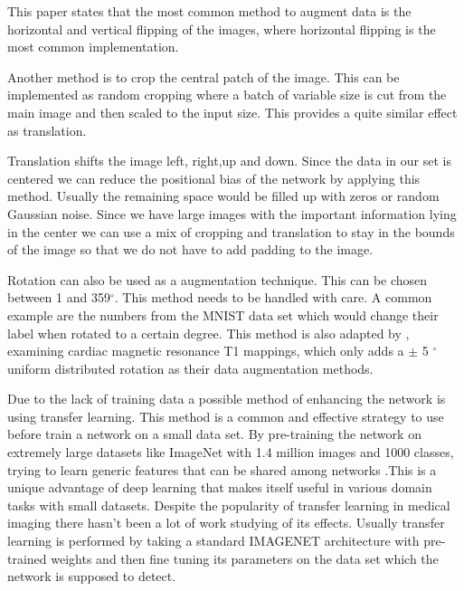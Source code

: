 \documentclass[
a4paper, 
12pt,
grayscalebody, %
abstract=on,
twoside, BCOR10mm, 12pt, DIV13,headinclude, footexclude, final, abstracton, openright
]{ibireprt}
\numberwithin{equation}{chapter}
\numberwithin{table}{chapter}
\numberwithin{figure}{chapter}
\numberwithin{algorithm}{chapter}
\numberwithin{example}{chapter}
\numberwithin{example}{chapter}
\begin{document}
This paper states that the most common method to augment data is the horizontal and vertical flipping of the images, where horizontal flipping is the most common implementation.

Another method is to crop the central patch of the image. This can be implemented as random cropping where a batch of variable size is cut from the main image and then scaled to the input size. This provides a quite similar effect as translation. 

Translation shifts the image left, right,up and  down. Since the data in our set is centered we can reduce the positional bias of the network by applying this method. Usually the remaining space would be filled up with zeros or random Gaussian noise. Since we have large images with the important information lying in the center we can use a mix of cropping and translation to stay in the bounds of the image so that we do not have to add padding to the image. 

Rotation can also be used as a augmentation technique. This can be chosen between 1 and 359$^\circ$. This method needs to be handled with care. A common example are the numbers from the MNIST data set which would change their label when rotated to a certain degree. This method is also adapted by \cite{Zhang2020}, examining cardiac magnetic resonance T1 mappings, which only adds a $\pm$ 5 $^\circ$ uniform distributed rotation as their data augmentation methods. 



Due to the lack of training data a possible method of enhancing the network is using transfer learning. This method is a common and effective strategy to use before train a network on a small data set. By pre-training the network on extremely large datasets like ImageNet with 1.4 million images and 1000 classes, trying to learn generic features that can be shared among networks \cite{Yamashita2018}.This is a unique advantage of deep learning that makes itself useful in various domain tasks with small datasets. Despite the popularity of transfer learning in medical imaging there hasn't been a lot of work studying of its effects. Usually transfer learning is performed by taking a standard IMAGENET architecture with pre-trained weights and then fine tuning its parameters on the data set which the network is supposed to detect.
\end{document}
